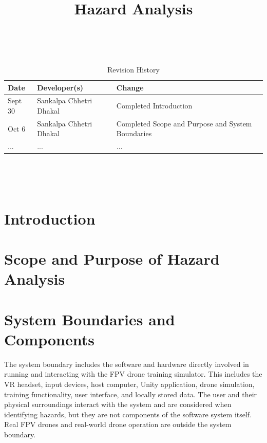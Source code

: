 \documentclass{article}
\title{Hazard Analysis\\\progname}
\author{\authname}
\date{}
\begin{document}
\maketitle
\thispagestyle{empty}

~\newpage


\begin{table}[hp]
\caption{Revision History} \label{TblRevisionHistory}
\begin{tabularx}{\textwidth}{llX}
\toprule
\textbf{Date} & \textbf{Developer(s)} & \textbf{Change}\\
\midrule
Sept 30 & Sankalpa Chhetri Dhakal & Completed Introduction\\
Oct 6 & Sankalpa Chhetri Dhakal & Completed Scope and Purpose and System Boundaries\\
... & ... & ...\\
\bottomrule
\end{tabularx}
\end{table}

~\newpage

\tableofcontents

~\newpage



\section{Introduction}


\section{Scope and Purpose of Hazard Analysis}

\section{System Boundaries and Components}

The system boundary includes the software and hardware directly involved in
running and interacting with the FPV drone training simulator. This includes
the VR headset, input devices, host computer, Unity application, drone
simulation, training functionality, user interface, and locally stored data.
The user and their physical surroundings interact with the system and are
considered when identifying hazards, but they are not components of the
software system itself. Real FPV drones and real-world drone operation are
outside the system boundary.
\end{document}
